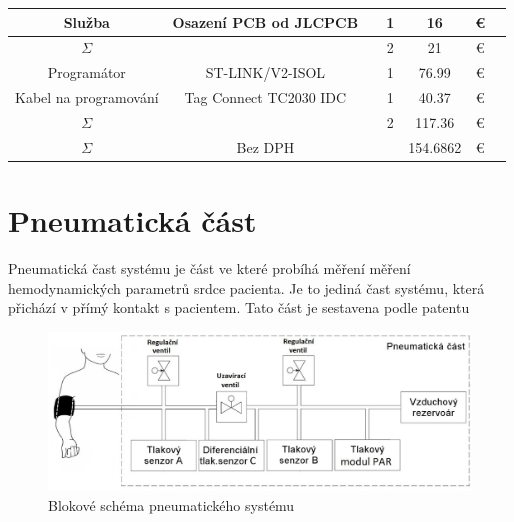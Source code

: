 \begin{table}[H]
\begin{ctucolortab}
\begin{tabular}{ccccccc}
            Služba                & Osazení PCB od JLCPCB  &               & 1     & 16       & €        & \\
            \bottomrule
            $\Sigma$              &                        &               & 2     & 21       & €        & \\
            \bottomrule
            Programátor           & ST-LINK/V2-ISOL        &               & 1     & 76.99    & €        & \\
            Kabel na programování & Tag Connect TC2030 IDC &               & 1     & 40.37    & €        & \\
            \bottomrule
            $\Sigma$              &                        &               & 2     & 117.36   & €        & \\
            \bottomrule
            \bottomrule
            $\Sigma$              & Bez DPH                &               &       & 154.6862 & €        & \\
            \bottomrule
        \end{tabular}
    \end{ctucolortab}
\end{table}
\section{Pneumatická část}
Pneumatická čast systému je část ve které probíhá měření měření hemodynamických parametrů srdce pacienta. Je to jediná čast systému, která přichází v přímý kontakt s pacientem. Tato část je sestavena podle
patentu \cite[US Patent US10251567]{cite:2}
\begin{figure}[H]
    \includegraphics[width=1\linewidth]{pictures/blokove_schema_pneu.jpg}
    \caption{Blokové schéma pneumatického systému}
    \label{fig:pneu_block}
\end{figure}
